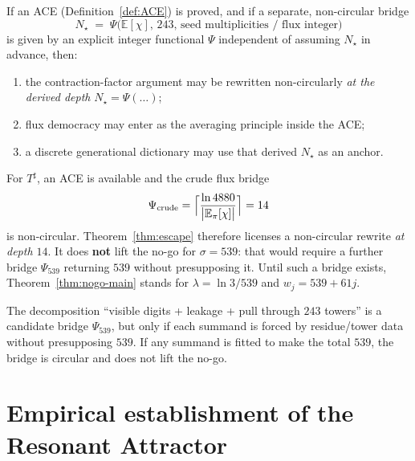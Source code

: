 \begin{theorem}
\label{thm:escape}
If an ACE (Definition~\ref{def:ACE}) is proved, and if a separate, non-circular
bridge
\begin{equation}
\label{eq:bridge}
N_\star
\;=\;
\Psi\bigl(\mathbb{E}[\chi],\,243,\,\text{seed multiplicities / flux integer}\bigr)
\end{equation}
is given by an explicit integer functional \(\Psi\) independent of assuming
\(N_\star\) in advance, then:
\begin{enumerate}[label=(\alph*)]
  \item the contraction-factor argument may be rewritten non-circularly
        \emph{at the derived depth} \(N_\star=\Psi(\ldots)\);
  \item flux democracy may enter as the averaging principle inside the ACE;
  \item a discrete generational dictionary may use that derived \(N_\star\) as
        an anchor.
\end{enumerate}
\end{theorem}

\begin{remark}
\label{rem:crude-bridge}
For \(T^\sharp\), an ACE is available and the crude flux bridge
\[
\Psi_{\mathrm{crude}}
=\Bigl\lceil\frac{\ln 4880}{\bigl|\mathbb{E}_\pi[\chi]\bigr|}\Bigr\rceil
=14
\]
is non-circular. Theorem~\ref{thm:escape} therefore licenses a non-circular
rewrite \emph{at depth \(14\)}. It does \textbf{not} lift the no-go for
\(\sigma=539\): that would require a further bridge \(\Psi_{539}\) returning
\(539\) without presupposing it. Until such a bridge exists,
Theorem~\ref{thm:nogo-main} stands for \(\lambda=\ln 3/539\) and
\(w_j=539+61j\).
\end{remark}

\begin{remark}[Published \(18+1+520=539\) composition]
The decomposition ``visible digits + leakage + pull through \(243\) towers''
is a candidate bridge \(\Psi_{539}\), but only if each summand is forced by
residue/tower data without presupposing \(539\). If any summand is fitted to
make the total \(539\), the bridge is circular and does not lift the no-go.
\end{remark}

\section{Empirical establishment of the Resonant Attractor}
\label{sec:empirical}

